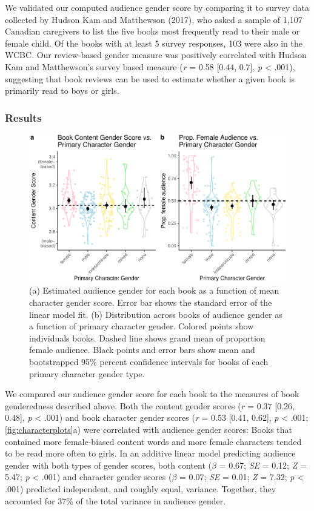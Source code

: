 \documentclass[
  english,
  ,man,floatsintext]{apa6}
\begin{document}
We validated our computed audience gender score by comparing it to survey data collected by Hudson Kam and Matthewson (2017), who asked a sample of 1,107 Canadian caregivers to list the five books most frequently read to their male or female child. Of the books with at least 5 survey responses, 103 were also in the WCBC. Our review-based gender measure was positively correlated with Hudson Kam and Matthewson's survey based measure (\emph{r} = 0.58 {[}0.44, 0.7{]}, \emph{p} \textless{} .001), suggesting that book reviews can be used to estimate whether a given book is primarily read to boys or girls.

\hypertarget{results-2}{%
\subsubsection{Results}\label{results-2}}

\begin{figure}[t!]
\includegraphics[width=\textwidth,]{kidbookgender_psych_sci_files/figure-latex/characterplots-1} \caption{(a) Estimated audience gender for each book as a function of mean character gender score. Error bar shows the standard error of the linear model fit. (b) Distribution across books of audience gender as a function of primary character gender. Colored points show individuals books. Dashed line shows grand mean of proportion female audience. Black points and error bars show mean and bootstrapped 95\% percent confidence intervals for books of each primary character gender type.}\label{fig:characterplots}
\end{figure}

We compared our audience gender score for each book to the measures of book genderedness described above. Both the content gender scores (\emph{r} = 0.37 {[}0.26, 0.48{]}, \emph{p} \textless{} .001) and book character gender scores (\emph{r} = 0.53 {[}0.41, 0.62{]}, \emph{p} \textless{} .001; \autoref{fig:characterplots}a) were correlated with audience gender scores: Books that contained more female-biased content words and more female characters tended to be read more often to girls. In an additive linear model predicting audience gender with both types of gender scores, both content (\(\beta\) = 0.67; \emph{SE} = 0.12; \emph{Z} = 5.47; \emph{p} \textless{} .001) and character gender scores (\(\beta\) = 0.07; \emph{SE} = 0.01; \emph{Z} = 7.32; \emph{p} \textless{} .001) predicted independent, and roughly equal, variance. Together, they accounted for 37\% of the total variance in audience gender.
\end{document}
